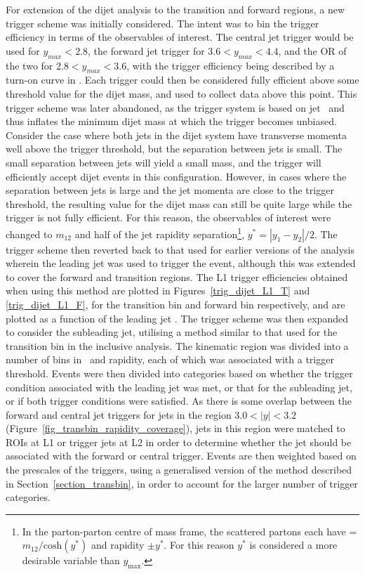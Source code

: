 For extension of the dijet analysis to the transition and forward regions, a new trigger scheme was initially considered. The intent was to bin the trigger efficiency in terms of the observables of interest. The central jet trigger would be used for $y_{max} < 2.8$, the forward jet trigger for $3.6 < y_{max} < 4.4$, and the OR of the two for $2.8 < y_{max} < 3.6$, with the trigger efficiency being described by a turn-on curve in \mass. Each trigger could then be considered fully efficient above some threshold value for the dijet mass, and used to collect data above this point. 
This trigger scheme was later abandoned, as the trigger system is based on jet \pt~and thus  inflates the minimum dijet mass at which the trigger becomes unbiased.
Consider the case where both jets in the dijet system have transverse momenta well above the trigger threshold, but the separation between jets is small. The small separation between jets will yield a small mass, and the trigger will efficiently accept dijet events in this configuration.
However, in cases where the separation between jets is large and the jet momenta are close to the trigger threshold, the resulting value for the dijet mass can still be quite large while the trigger is not fully efficient. 
%
For this reason, the observables of interest were changed to $m_{12}$ and half of the jet rapidity separation\footnote{In the parton-parton centre of mass frame, the scattered partons each have \pt = $m_{12}/\mathrm{cosh}(y^*)$ and rapidity $\pm y^*$. For this reason $y^*$ is considered a more desirable variable than $y_\mathrm{max}$.}, $y^* = |y_1 - y_2|/2$. The  trigger scheme then reverted back to that used for earlier versions of the analysis wherein the leading jet was used to trigger the event, although this was extended to cover the forward and transition regions. The L1 trigger efficiencies obtained when using this method are plotted in Figures~\ref{trig_dijet_L1_T} and \ref{trig_dijet_L1_F}, for the transition bin and forward bin respectively, and are plotted as a function of the leading jet \pt. The trigger scheme was then expanded to consider the subleading jet, utilising a method similar to that used for the transition bin in the inclusive analysis. The kinematic region was divided into a number of bins in \pt~and rapidity, each of which was associated with a trigger threshold.  Events were then divided into categories based on whether the trigger condition associated with the leading jet was met, or that for the subleading jet, or if both trigger conditions were satisfied. As there is some overlap between the forward and central jet triggers for jets in the region $3.0 < |y| < 3.2$ (Figure~\ref{fig_transbin_rapidity_coverage}), jets in this region were matched to ROIs at L1 or trigger jets at L2 in order to determine whether the jet should be associated with the forward or central trigger. Events are then weighted based on the prescales of the triggers, using a generalised version of the method described in Section~\ref{section_transbin}, in order to account for the larger number of trigger categories.


